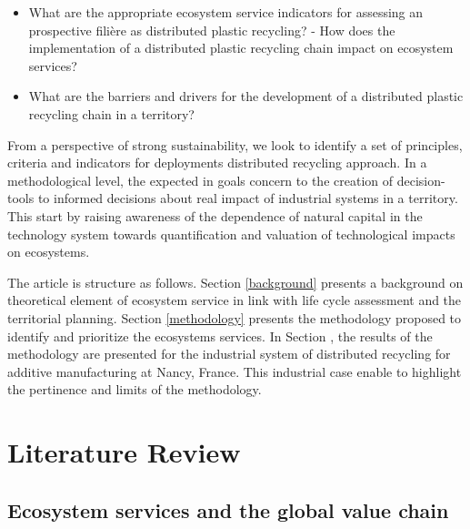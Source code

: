 \documentclass[]{elsarticle} %
\providecommand{\tightlist}{%
  \setlength{\itemsep}{0pt}\setlength{\parskip}{0pt}}
\def\tightlist{}
\begin{document}
\begin{itemize}
\tightlist
\item
  What are the appropriate ecosystem service indicators for assessing an prospective filière as distributed plastic recycling? - How does the implementation of a distributed plastic recycling chain impact on ecosystem services?
\item
  What are the barriers and drivers for the development of a distributed plastic recycling chain in a territory?
\end{itemize}

From a perspective of strong sustainability, we look to identify a set of principles, criteria and indicators for deployments distributed recycling approach.
In a methodological level, the expected in goals concern to the creation of decision-tools to informed decisions about real impact of industrial systems in a territory.
This start by raising awareness of the dependence of natural capital in the technology system towards quantification and valuation of technological impacts on ecosystems.

The article is structure as follows.
Section \ref{background} presents a background on theoretical element of ecosystem service in link with life cycle assessment and the territorial planning.
Section \ref{methodology} presents the methodology proposed to identify and prioritize the ecosystems services.
In Section \label{results}, the results of the methodology are presented for the industrial system of distributed recycling for additive manufacturing at Nancy, France.
This industrial case enable to highlight the pertinence and limits of the methodology.

\hypertarget{literature-review}{%
\section{Literature Review}\label{literature-review}}

\label{background}

\hypertarget{ecosystem-services-and-the-global-value-chain}{%
\subsection{Ecosystem services and the global value chain}\label{ecosystem-services-and-the-global-value-chain}}
\end{document}

